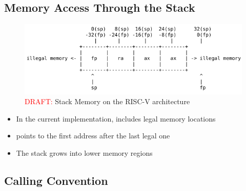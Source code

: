 \subsection{Memory Access Through the Stack}

\begin{figure}[h]
	\includegraphics[width=\textwidth]{./riscv_stack_draft.png}
	\caption{\textcolor{red}{DRAFT:} Stack Memory on the RISC-V architecture}\label{fig:riscv_stack}
\end{figure}

\begin{itemize}
	\item In the current implementation,  includes legal memory locations
	\item {} points to the first address after the last legal one
	\item The stack grows into lower memory regions
\end{itemize}

\subsection{Calling Convention}

